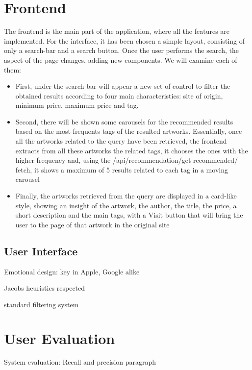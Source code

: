 \documentclass[12pt]{spieman}  %
\begin{document}
\begin{spacing}{1}
    \section{Frontend}
    The frontend is the main part of the application, where all the features are implemented.\newline
    For the interface, it has been chosen a simple layout, consisting of only a search-bar and a search button. Once the user performs the search, the aspect of the page changes, adding new components. We will examine each of them:
    \begin{itemize}
        \item First, under the search-bar will appear a new set of control to filter the obtained results according to four main characteristics: site of origin, minimum price, maximum price and tag.
        \item Second, there will be shown some carousels for the recommended results based on the most frequents tags of the resulted artworks. Essentially, once all the artworks related to the query have been retrieved, the frontend extracts from all these artworks the related tags, it chooses the ones with the higher frequency and, using the /api/recommendation/get-recommended/ fetch, it shows a maximum of 5 results related to each tag in a moving carousel
        \item Finally, the artworks retrieved from the query are displayed in a card-like style, showing an insight of the artwork, the author, the title, the price, a short description and the main tags, with a Visit button that will bring the user to the page of that artwork in the original site
    \end{itemize}

    \subsection{User Interface}\label{sec:ui}

    Emotional design: key in Apple, Google alike

    Jacobs heuristics respected

    standard filtering system


    \section{User Evaluation}
    System evaluation: Recall and precision paragraph


\end{spacing}
\end{document}
